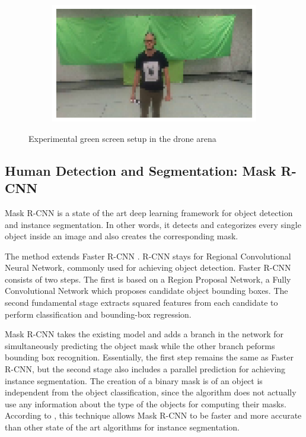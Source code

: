 \begin{figure}[!h]
\begin{center}
\begin{subfigure}[h]{0.24\textwidth}
		\end{subfigure}
		\hfill
		\begin{subfigure}[h]{0.24\textwidth}
			\centering
			\includegraphics[width=1\textwidth]{"contents/images/04-greenscreen-4"}
		\end{subfigure}
	\end{center}
	\vspace{-0.5cm}
	\caption[Experimental green screen setup in the drone arena]{Experimental green screen setup in the drone arena}
	\label{fig:greenscreen}
\end{figure}



\subsection{Human Detection and Segmentation: Mask R-CNN}
\label{subsec:sota-maskrcnn}

Mask R-CNN \cite{he2018mask} is a state of the art deep learning framework for object detection and instance segmentation. In other words, it detects and categorizes every single object inside an image and also creates the corresponding mask.

The method extends Faster R-CNN \cite{ren2016faster}. R-CNN stays for Regional Convolutional Neural Network, commonly used for achieving object detection. Faster R-CNN consists of two steps. The first is based on a Region Proposal Network, a Fully Convolutional Network \cite{shelhamer2016fully} which proposes candidate object bounding boxes. The second fundamental stage extracts squared features from each candidate to perform classification and bounding-box regression. 

Mask R-CNN takes the existing model and adds a branch in the network for simultaneously predicting the object mask while the other branch peforms bounding box recognition. Essentially, the first step remains the same as Faster R-CNN, but the second stage also includes a parallel prediction for achieving instance segmentation. The creation of a binary mask is of an object is independent from the object classification, since the algorithm does not actually use any information about the type of the objects for computing their masks. According to \cite{he2018mask}, this technique allows Mask R-CNN to be faster and more accurate than other state of the art algorithms for instance segmentation.

